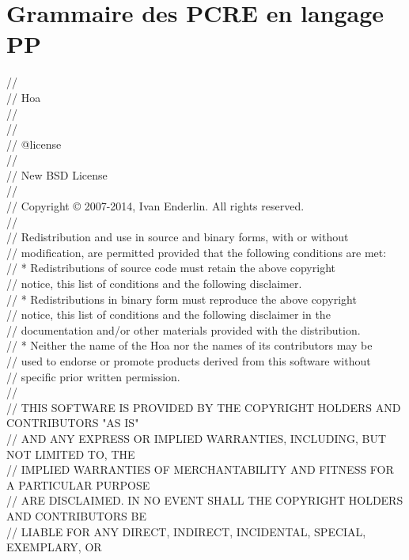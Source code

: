 \section{Grammaire des PCRE en langage PP}
\label{appendices:grammar_of_pcre}

\begin{bigbigpre}
// \\
// Hoa \\
// \\
// \\
// @license \\
// \\
// New BSD License \\
// \\
// Copyright © 2007-2014, Ivan Enderlin. All rights reserved. \\
// \\
// Redistribution and use in source and binary forms, with or without \\
// modification, are permitted provided that the following conditions are met: \\
//     * Redistributions of source code must retain the above copyright \\
//       notice, this list of conditions and the following disclaimer. \\
//     * Redistributions in binary form must reproduce the above copyright \\
//       notice, this list of conditions and the following disclaimer in the \\
//       documentation and/or other materials provided with the distribution. \\
//     * Neither the name of the Hoa nor the names of its contributors may be \\
//       used to endorse or promote products derived from this software without \\
//       specific prior written permission. \\
// \\
// THIS SOFTWARE IS PROVIDED BY THE COPYRIGHT HOLDERS AND CONTRIBUTORS "AS IS" \\
// AND ANY EXPRESS OR IMPLIED WARRANTIES, INCLUDING, BUT NOT LIMITED TO, THE \\
// IMPLIED WARRANTIES OF MERCHANTABILITY AND FITNESS FOR A PARTICULAR PURPOSE \\
// ARE DISCLAIMED. IN NO EVENT SHALL THE COPYRIGHT HOLDERS AND CONTRIBUTORS BE \\
// LIABLE FOR ANY DIRECT, INDIRECT, INCIDENTAL, SPECIAL, EXEMPLARY, OR \\

\end{bigbigpre}
